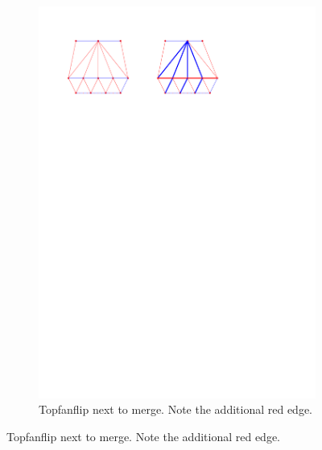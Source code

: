 \begin{figure}
\begin{subfigure}[b]{0.45 \textwidth}
        \includegraphics[width =\textwidth]{topFanFlips/img/mergeend}
        \caption{Topfanflip next to merge. Note the additional red edge.}
    \end{subfigure}


\end{figure}
